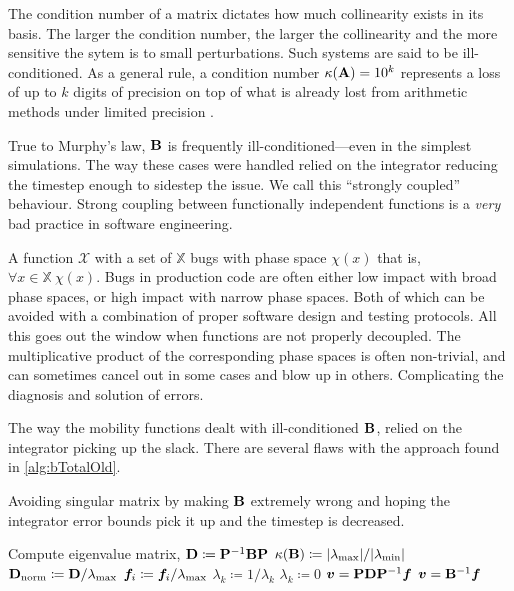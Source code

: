 The condition number of a matrix dictates how much collinearity exists in its basis. The larger the condition number, the larger the collinearity and the more sensitive the sytem is to small perturbations. Such systems are said to be ill-conditioned. As a general rule, a condition number $\kappa(\mathbf{A}) = 10^k$ represents a loss of up to $k$ digits of precision on top of what is already lost from arithmetic methods under limited precision \cite{cheney2012numerical}.

True to Murphy's law, $\mathbf{B}$ is frequently ill-conditioned---even in the simplest simulations. The way these cases were handled relied on the integrator reducing the timestep enough to sidestep the issue. We call this ``strongly coupled'' behaviour. Strong coupling between functionally independent functions is a \emph{very} bad practice in software engineering.

A function $\mathcal{X}$ with a set of $\mathbb{X}$ bugs with phase space $\chi(x)$ that is, $\forall x \in \mathbb{X}~ \chi(x)$. Bugs in production code are often either low impact with broad phase spaces, or high impact with narrow phase spaces. Both of which can be avoided with a combination of proper software design and testing protocols. All this goes out the window when functions are not properly decoupled. The multiplicative product of the corresponding phase spaces is often non-trivial, and can sometimes cancel out in some cases and blow up in others. Complicating the diagnosis and solution of errors.

The way the mobility functions dealt with ill-conditioned $\mathbf{B}$, relied on the integrator picking up the slack. There are several flaws with the approach found in \cref{alg:bTotalOld}.
\begin{algorithm}
    \caption{Avoiding singular matrix by making $\mathbf{B}$ extremely wrong and hoping the integrator error bounds pick it up and the timestep is decreased.}
    \label{alg:bTotalOld}
    \begin{algorithmic}
        \State Compute eigenvalue matrix, $\mathbf{D} \coloneqq \mathbf{P}^{-1} \mathbf{B} \mathbf{P}$
        \State $\kappa(\mathbf{B}) \coloneqq \lvert \lambda_{\textrm{max}} \rvert/ \lvert \lambda_{\textrm{min}} \rvert$
        \State $\mathbf{D}_{\textrm{norm}} \coloneqq \mathbf{D} / \lambda_{\textrm{max}}$
        \State $\vec{f}_i \coloneqq \vec{f}_i / \lambda_{\rvar{max}}$
        \State $\lambda_k \coloneqq 1/\lambda_k$
        \Else
        \State $\lambda_k \coloneqq 0$
        \EndIf
        \EndFor
        \State $\vec{v} = \mtx{P} \mtx{D} \mtx{P}^{-1} \vec{f}$
        \Else
        \State $\vec{v} = \mtx{B}^{-1} \vec{f}$
        \EndIf
    \end{algorithmic}
\end{algorithm}

